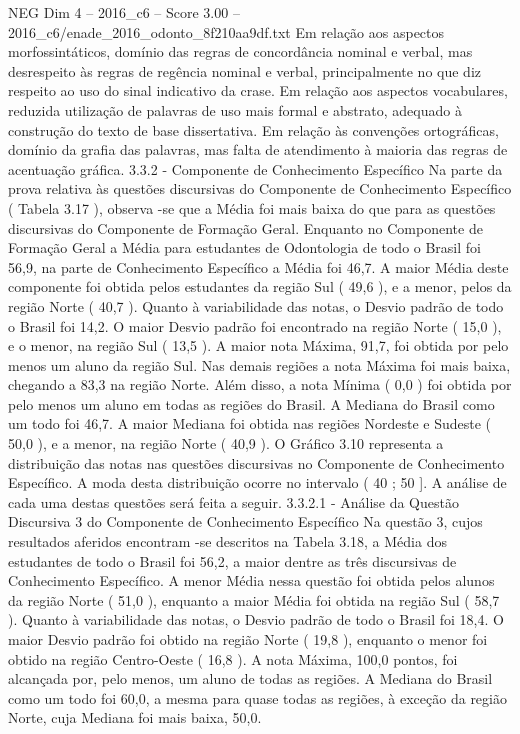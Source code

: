 \begin{textsample}{NEG Dim 4 – 2016\_c6 – Score 3.00 – 2016\_c6/enade\_2016\_odonto\_8f210aa9df.txt}
Em relação aos aspectos morfossintáticos, domínio das regras de concordância nominal e verbal, mas desrespeito às regras de regência nominal e verbal, principalmente no que diz respeito ao uso do sinal indicativo da crase.
Em relação aos aspectos vocabulares, reduzida utilização de palavras de uso mais formal e abstrato, adequado à construção do texto de base dissertativa.
Em relação às convenções ortográficas, domínio da grafia das palavras, mas falta de atendimento à maioria das regras de acentuação gráfica. 3.3.2 - Componente de Conhecimento Específico Na parte da prova relativa às questões discursivas do Componente de Conhecimento Específico ( Tabela 3.17 ), observa -se que a Média foi mais baixa do que para as questões discursivas do Componente de Formação Geral.
Enquanto no Componente de Formação Geral a Média para estudantes de Odontologia de todo o Brasil foi 56,9, na parte de Conhecimento Específico a Média foi 46,7.
A maior Média deste componente foi obtida pelos estudantes da região Sul ( 49,6 ), e a menor, pelos da região Norte ( 40,7 ).
Quanto à variabilidade das notas, o Desvio padrão de todo o Brasil foi 14,2.
O maior Desvio padrão foi encontrado na região Norte ( 15,0 ), e o menor, na região Sul ( 13,5 ).
A maior nota Máxima, 91,7, foi obtida por pelo menos um aluno da região Sul.
Nas demais regiões a nota Máxima foi mais baixa, chegando a 83,3 na região Norte.
Além disso, a nota Mínima ( 0,0 ) foi obtida por pelo menos um aluno em todas as regiões do Brasil.
A Mediana do Brasil como um todo foi 46,7.
A maior Mediana foi obtida nas regiões Nordeste e Sudeste ( 50,0 ), e a menor, na região Norte ( 40,9 ).
O Gráfico 3.10 representa a distribuição das notas nas questões discursivas no Componente de Conhecimento Específico.
A moda desta distribuição ocorre no intervalo ( 40 ; 50 ].
A análise de cada uma destas questões será feita a seguir. 3.3.2.1 - Análise da Questão Discursiva 3 do Componente de Conhecimento Específico Na questão 3, cujos resultados aferidos encontram -se descritos na Tabela 3.18, a Média dos estudantes de todo o Brasil foi 56,2, a maior dentre as três discursivas de Conhecimento Específico.
A menor Média nessa questão foi obtida pelos alunos da região Norte ( 51,0 ), enquanto a maior Média foi obtida na região Sul ( 58,7 ).
Quanto à variabilidade das notas, o Desvio padrão de todo o Brasil foi 18,4.
O maior Desvio padrão foi obtido na região Norte ( 19,8 ), enquanto o menor foi obtido na região Centro-Oeste ( 16,8 ).
A nota Máxima, 100,0 pontos, foi alcançada por, pelo menos, um aluno de todas as regiões.
A Mediana do Brasil como um todo foi 60,0, a mesma para quase todas as regiões, à exceção da região Norte, cuja Mediana foi mais baixa, 50,0.

\end{textsample}
